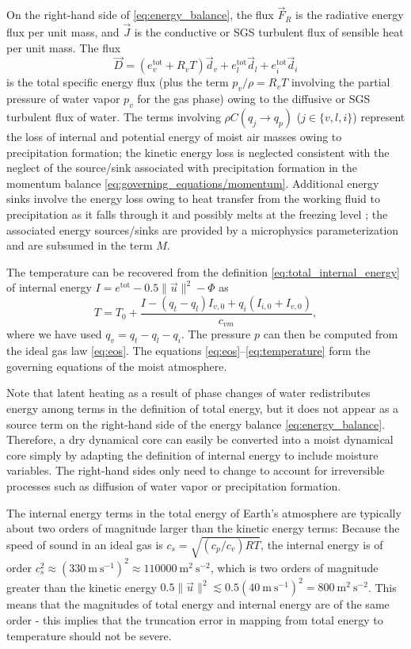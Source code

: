 \documentclass{article}
\begin{document}
On the right-hand side of \eqref{eq:energy_balance}, the flux $\vec{F}_R$ is the radiative energy flux per unit mass, and $\vec{J}$ is the conductive or SGS turbulent flux of sensible heat per unit mass. The flux 
\begin{equation}
\vec{D} = (e_v^{\mathrm{tot}} + R_v T) \vec{d}_v + e_l^{\mathrm{tot}} \vec{d}_l +  e_i^{\mathrm{tot}} \vec{d}_i
\end{equation}
is the total specific energy flux (plus the term $p_v/\rho = R_v T$ involving the partial pressure of water vapor $p_v$ for the gas phase) owing to the diffusive or SGS turbulent flux of water. The terms involving $\rho C(q_j \rightarrow q_p)$ ($j \in \{ v, l, i \}$) represent the loss of internal and potential energy of moist air masses owing to precipitation formation; the kinetic energy loss is neglected consistent with the neglect of the source/sink associated with precipitation formation in the momentum balance \eqref{eq:governing_equations/momentum}. Additional energy sinks involve the energy loss owing to heat transfer from the working fluid to precipitation as it falls through it and possibly melts at the freezing level \citep{Raymond13b}; the associated energy sources/sinks are provided by a microphysics parameterization and are subsumed in the term $M$.

The temperature can be recovered from the definition \eqref{eq:total_internal_energy} of internal energy $I = e^{\mathrm{tot}} - 0.5 \| \vec{u} \|^2 - \Phi$  as 
\begin{equation}
    T = T_0 + \frac{I - (q_t - q_l) I_{v,0} + q_i (I_{i,0} + I_{v,0})}{c_{vm}},
    \label{eq:temperature}
\end{equation}
where we have used $q_v = q_t - q_l - q_i$. The pressure $p$ can then be computed from the ideal gas law \eqref{eq:eos}. The equations \eqref{eq:eos}--\eqref{eq:temperature} form the governing equations of the moist atmosphere.

Note that latent heating as a result of phase changes of water redistributes energy among terms in the definition of total energy, but it does not appear as a source term on the right-hand side of the energy balance \eqref{eq:energy_balance}. Therefore, a dry dynamical core can easily be converted into a moist dynamical core simply by adapting the definition of internal energy to include moisture variables. The right-hand sides only need to change to account for irreversible processes such as diffusion of water vapor or precipitation formation. 

The internal energy terms in the total energy of Earth's atmosphere are typically about two orders of magnitude larger than the kinetic energy terms: Because the speed of sound in an ideal gas is $c_s = \sqrt{(c_p/c_v) R T}$, the internal energy is of order $c_s^2 \approx (330~\mathrm{m~s^{-1}})^2 \approx 110000~\mathrm{m^2~s^{-2}}$, which is two orders of magnitude greater than the kinetic energy $0.5 \|\vec{u}\|^2 \lesssim 0.5(40~\mathrm{m~s^{-1}})^2 = 800~\mathrm{m^2~s^{-2}}$. This means that the magnitudes of total energy and internal energy are of the same order - this implies that the truncation error in mapping from total energy to temperature should not be severe.
\end{document}
